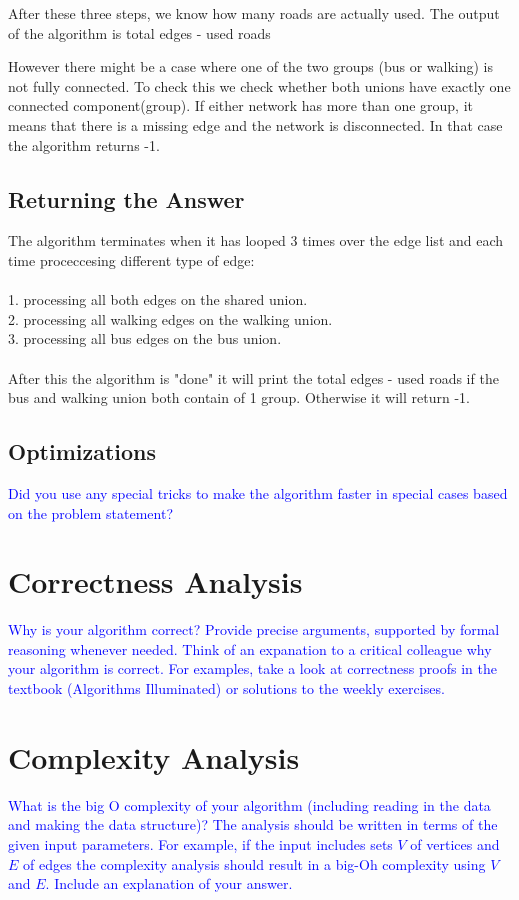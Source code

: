 \documentclass[a4paper]{article}
\newcommand{\instruction}[1]{\textcolor{blue}{#1}}
\begin{document}
After these three steps, we know how many roads are actually used.
The output of the algorithm is total edges - used roads

However there might be a case where one of the two groups (bus or walking) is not fully connected.
To check this we check whether both unions have exactly one connected component(group).
If either network has more than one group, it means that there is a missing edge and the network is disconnected.
In that case the algorithm returns -1.


\subsection{Returning the Answer}
The algorithm terminates when it has looped 3 times over the edge list and each time proceccesing different type of edge:
\\
\\
1. processing all both edges on the shared union.
\\
2. processing all walking edges on the walking union.
\\
3. processing all bus edges on the bus union.
\\
\\
After this the algorithm is "done" it will print the total edges - used roads if the bus and walking union both contain of 1 group. Otherwise it will return -1. 
\subsection{Optimizations}
\instruction{Did you use any special tricks to make the algorithm faster in special cases based on the problem statement?}

\section{Correctness Analysis}
\instruction{Why is your algorithm correct? Provide precise arguments, supported by formal reasoning whenever needed. Think of an expanation to a critical colleague why your algorithm is correct. For examples, take a look at correctness proofs in the textbook (Algorithms Illuminated) or solutions to the weekly exercises.}


\section{Complexity Analysis}
\instruction{What is the big O complexity of your algorithm (including reading in the data and making the data structure)? The analysis should be written in terms of the given input parameters. For example, if the input includes sets $V$ of vertices and $E$ of edges the complexity analysis should result in a big-Oh complexity using $V$ and $E$. Include an explanation of your answer.} 
\end{document}
